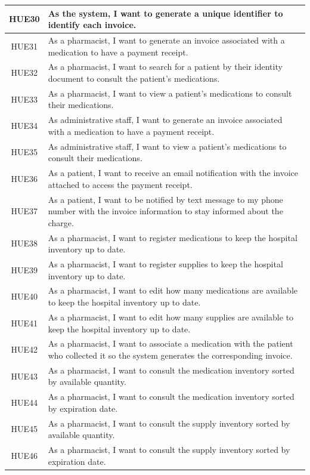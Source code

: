 \documentclass{prgrado}
\begin{document}
\begin{longtable}{|c|p{12cm}|}
HUE30 & As the system, I want to generate a unique identifier to identify each invoice. \\ \hline
HUE31 & As a pharmacist, I want to generate an invoice associated with a medication to have a payment receipt. \\ \hline
HUE32 & As a pharmacist, I want to search for a patient by their identity document to consult the patient's medications. \\ \hline
HUE33 & As a pharmacist, I want to view a patient's medications to consult their medications. \\ \hline
HUE34 & As administrative staff, I want to generate an invoice associated with a medication to have a payment receipt. \\ \hline
HUE35 & As administrative staff, I want to view a patient's medications to consult their medications. \\ \hline
HUE36 & As a patient, I want to receive an email notification with the invoice attached to access the payment receipt. \\ \hline
HUE37 & As a patient, I want to be notified by text message to my phone number with the invoice information to stay informed about the charge. \\ \hline
HUE38 & As a pharmacist, I want to register medications to keep the hospital inventory up to date. \\ \hline
HUE39 & As a pharmacist, I want to register supplies to keep the hospital inventory up to date. \\ \hline
HUE40 & As a pharmacist, I want to edit how many medications are available to keep the hospital inventory up to date. \\ \hline
HUE41 & As a pharmacist, I want to edit how many supplies are available to keep the hospital inventory up to date. \\ \hline
HUE42 & As a pharmacist, I want to associate a medication with the patient who collected it so the system generates the corresponding invoice. \\ \hline
HUE43 & As a pharmacist, I want to consult the medication inventory sorted by available quantity. \\ \hline
HUE44 & As a pharmacist, I want to consult the medication inventory sorted by expiration date. \\ \hline
HUE45 & As a pharmacist, I want to consult the supply inventory sorted by available quantity. \\ \hline
HUE46 & As a pharmacist, I want to consult the supply inventory sorted by expiration date. \\ \hline

\end{longtable}
\end{document}
